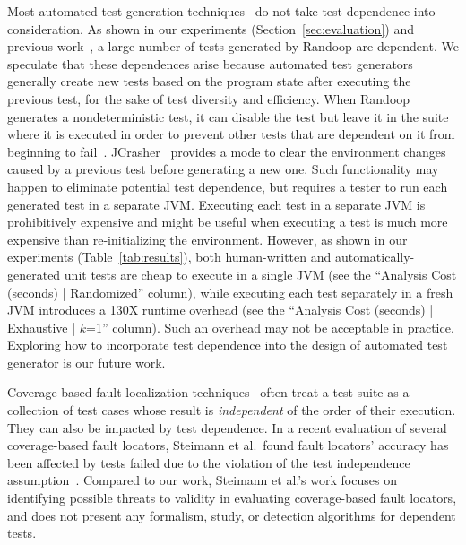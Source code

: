 Most automated test generation
techniques~\cite{PachecoLET2007, Wang:2007:AGC,
ZhangSBE2011} do not take test dependence
into consideration. As shown in our experiments
(Section~\ref{sec:evaluation}) and previous work~\cite{RobinsonEPAL2011},
a large number of tests generated by Randoop are dependent.
We speculate that these dependences arise because automated
test generators generally create new tests
based on the program state after executing the previous test,
for the sake of test diversity and efficiency. 
When Randoop generates a nondeterministic test, it can disable the test but
leave it in the suite where it is executed in order to prevent other tests
that are dependent on it from beginning to fail~\cite{RobinsonEPAL2011}.
JCrasher~\cite{Csallner:2004}
provides a mode to clear the environment changes caused
by a previous test before generating a new one. Such functionality may happen to eliminate
potential test dependence, but requires a tester to
run each generated test in a separate JVM.
Executing each test in a separate JVM is prohibitively expensive
and might be useful when executing
a test is much more expensive than re-initializing the environment.
However, as shown in
our experiments (Table~\ref{tab:results}), both human-written and automatically-generated
unit tests are cheap to execute in a single JVM (see the ``Analysis Cost (seconds) | Randomized'' column), while
executing each test separately in a fresh JVM introduces a 130X runtime overhead
(see the ``Analysis Cost (seconds) | Exhaustive | $k$=1'' column). Such an overhead 
may not be acceptable in practice.
Exploring how to incorporate test dependence into the design of automated
test generator is our future work.

Coverage-based fault localization techniques~\cite{Jones:2002:VTI}
often treat a test suite as a collection of test cases
whose result is \textit{independent} of the order of their
execution. They can also be impacted by test dependence.
In a recent evaluation of several coverage-based fault locators,
 Steimann et al.\ found fault locators' accuracy has been 
 affected by tests failed due to the violation of the test
 independence assumption~\cite{Steimann:2013}. 
 Compared to our work, Steimann et al.'s
 work focuses on identifying possible threats to validity
 in evaluating coverage-based fault locators, and does
 not present any formalism, study, or detection algorithms
 for dependent tests.



